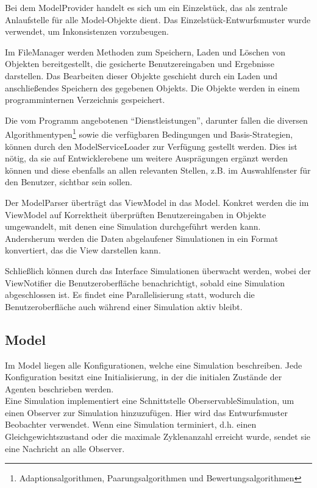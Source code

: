 Bei dem ModelProvider handelt es sich um ein Einzelstück, das als zentrale Anlaufstelle für alle Model-Objekte dient. Das Einzelstück-Entwurfsmuster wurde verwendet, um Inkonsistenzen vorzubeugen.

Im FileManager werden Methoden zum Speichern, Laden und Löschen von Objekten bereitgestellt, die gesicherte Benutzereingaben und Ergebnisse darstellen. Das Bearbeiten dieser Objekte geschieht durch ein Laden und anschließendes Speichern des gegebenen Objekts.
Die Objekte werden in einem programminternen Verzeichnis gespeichert.

Die vom Programm angebotenen "`Dienstleistungen"', darunter fallen die diversen Algorithmentypen\footnote{Adaptionsalgorithmen, Paarungsalgorithmen und Bewertungsalgorithmen} sowie die verfügbaren Bedingungen und Basis-Strategien, können durch den ModelServiceLoader zur Verfügung gestellt werden.
Dies ist nötig, da sie auf Entwicklerebene um weitere Ausprägungen ergänzt werden können und diese ebenfalls an allen relevanten Stellen, z.B. im Auswahlfenster für den Benutzer, sichtbar sein sollen.

Der ModelParser überträgt das ViewModel in das Model. Konkret werden die im ViewModel auf Korrektheit überprüften Benutzereingaben in Objekte umgewandelt, mit denen eine Simulation durchgeführt werden kann. Andersherum werden die Daten abgelaufener Simulationen in ein Format konvertiert, das die View darstellen kann.

Schließlich können durch das Interface Simulationen überwacht werden, wobei der ViewNotifier die Benutzeroberfläche benachrichtigt, sobald eine Simulation abgeschlossen ist. Es findet eine Parallelisierung statt, wodurch die Benutzeroberfläche auch während einer Simulation aktiv bleibt.

\subsection{Model}

\noindent
{}


Im Model liegen alle Konfigurationen, welche eine Simulation beschreiben. Jede Konfiguration besitzt eine Initialisierung, in der die initialen Zustände der Agenten beschrieben werden. \\

Eine Simulation implementiert eine Schnittstelle OberservableSimulation, um einen Observer zur Simulation hinzuzufügen. Hier wird das Entwurfsmuster Beobachter verwendet. Wenn eine Simulation terminiert, d.h. einen Gleichgewichtszustand oder die maximale Zyklenanzahl erreicht wurde, sendet sie eine Nachricht an alle Observer.

